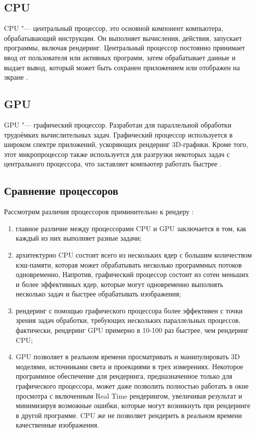\subsection{CPU}
CPU "--- центральный процессор, это основной компонент компьютера, обрабатывающий инструкции. 
Он выполняет вычисления, действия, запускает программы, включая рендеринг. 
Центральный процессор постоянно принимает ввод от пользователя или активных программ, затем обрабатывает данные и выдает вывод, который может быть сохранен приложением или отображен на экране \cite{article:cpu_gpu}.
\subsection{GPU}
GPU "--- графический процессор. Разработан для параллельной обработки трудоёмких вычислительных задач. 
Графический процессор используется в широком спектре приложений, ускоряющих рендеринг 3D-графики.
Кроме того, этот микропроцессор также используется для разгрузки некоторых задач с центрального процессора, что заставляет компьютер работать быстрее \cite{article:cpu_gpu}.
\subsection{Сравнение процессоров}
Рассмотрим различия процессоров приминительно к рендеру \cite{cpu_or_gpu}:
\begin{enumerate}
  \item главное различие между процессорами CPU и GPU заключается в том, как каждый из них выполняет разные задачи;
  \item архитектурно CPU состоит всего из нескольких ядер с большим количеством кэш-памяти, которая может обрабатывать несколько программных потоков одновременно, 
  Напротив, графический процессор состоит из сотен меньших и более эффективных ядер, которые могут одновременно выполнять несколько задач и быстрее обрабатывать изображения;
  \item рендеринг с помощью графического процессора более эффективен с точки зрения задач обработки, требующих нескольких параллельных процессов,
  фактически, рендеринг GPU примерно в 10-100 раз быстрее, чем рендеринг CPU;
  \item GPU позволяет в реальном времени просматривать и манипулировать 3D моделями, источниками света и проекциями в трех измерениях. Некоторое программное обеспечение для рендеринга, 
  предназначенное только для графического процессора, может даже позволить полностью работать в окне просмотра с включенным Real Time рендерингом, увеличивая результат и минимизируя возможные ошибки, которые могут возникнуть при рендеринге в другой программе. 
  CPU же не позволяет рендерить в реальном времени качественные изображения.
\end{enumerate}


